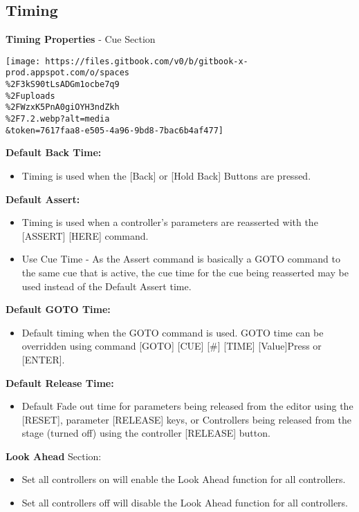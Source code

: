 \documentclass[
]{article}
\providecommand{\tightlist}{%
  \setlength{\itemsep}{0pt}\setlength{\parskip}{0pt}}
\begin{document}
\hypertarget{timing}{%
\subsection{Timing}\label{timing}}

\textbf{Timing Properties} - Cue Section

\texttt{[image: https://files.gitbook.com/v0/b/gitbook-x-prod.appspot.com/o/spaces\\\%2F3kS90tLsADGm1ocbe7q9\\\%2Fuploads\\\%2FWzxK5PnA0giOYH3ndZkh\\\%2F7.2.webp?alt=media\\\&token=7617faa8-e505-4a96-9bd8-7bac6b4af477]}

\textbf{Default Back Time:}

\begin{itemize}
\tightlist
\item
  Timing is used when the {[}Back{]} or {[}Hold Back{]} Buttons are pressed.
\end{itemize}

\textbf{Default Assert:}

\begin{itemize}
\item
  Timing is used when a controller's parameters are reasserted with the {[}ASSERT{]} {[}HERE{]} command.
\item
  Use Cue Time - As the Assert command is basically a GOTO command to the same cue that is active, the cue time for the cue being reasserted may be used instead of the Default Assert time.
\end{itemize}

\textbf{Default GOTO Time:}

\begin{itemize}
\tightlist
\item
  Default timing when the GOTO command is used. GOTO time can be overridden using command {[}GOTO{]} {[}CUE{]} {[}\#{]} {[}TIME{]} {[}Value{]}Press \href{image.png}{} or {[}ENTER{]}.
\end{itemize}

\textbf{Default Release Time:}

\begin{itemize}
\tightlist
\item
  Default Fade out time for parameters being released from the editor using the {[}RESET{]}, parameter {[}RELEASE{]} keys, or Controllers being released from the stage (turned off) using the controller {[}RELEASE{]} button.
\end{itemize}

\textbf{Look Ahead} Section:

\begin{itemize}
\item
  Set all controllers on will enable the Look Ahead function for all controllers.
\item
  Set all controllers off will disable the Look Ahead function for all controllers.
\end{itemize}
\end{document}
